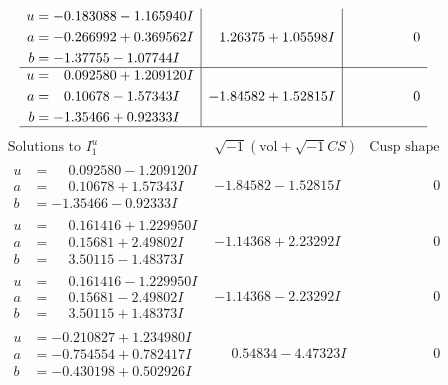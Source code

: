 \documentclass[1p]{elsarticle_modified}
\theoremstyle{definition}
\newcommand{\I}{\sqrt{-1}}
\begin{document}
$$\begin{array}{c|c|c}
\begin{aligned}
u &= -0.183088 - 1.165940 I \\
a &= -0.266992 + 0.369562 I \\
b &= -1.37755 - 1.07744 I\end{aligned}
 & \phantom{-}1.26375 + 1.05598 I & \phantom{-0.000000 } 0 \\ \hline\begin{aligned}
u &= \phantom{-}0.092580 + 1.209120 I \\
a &= \phantom{-}0.10678 - 1.57343 I \\
b &= -1.35466 + 0.92333 I\end{aligned}
 & -1.84582 + 1.52815 I & \phantom{-0.000000 } 0\\
 \hline 
 \end{array}$$\newpage$$\begin{array}{c|c|c}  
\text{Solutions to }I^u_{1}& \I (\text{vol} + \sqrt{-1}CS) & \text{Cusp shape}\\
 \hline 
\begin{aligned}
u &= \phantom{-}0.092580 - 1.209120 I \\
a &= \phantom{-}0.10678 + 1.57343 I \\
b &= -1.35466 - 0.92333 I\end{aligned}
 & -1.84582 - 1.52815 I & \phantom{-0.000000 } 0 \\ \hline\begin{aligned}
u &= \phantom{-}0.161416 + 1.229950 I \\
a &= \phantom{-}0.15681 + 2.49802 I \\
b &= \phantom{-}3.50115 - 1.48373 I\end{aligned}
 & -1.14368 + 2.23292 I & \phantom{-0.000000 } 0 \\ \hline\begin{aligned}
u &= \phantom{-}0.161416 - 1.229950 I \\
a &= \phantom{-}0.15681 - 2.49802 I \\
b &= \phantom{-}3.50115 + 1.48373 I\end{aligned}
 & -1.14368 - 2.23292 I & \phantom{-0.000000 } 0 \\ \hline\begin{aligned}
u &= -0.210827 + 1.234980 I \\
a &= -0.754554 + 0.782417 I \\
b &= -0.430198 + 0.502926 I\end{aligned}
 & \phantom{-}0.54834 - 4.47323 I & \phantom{-0.000000 } 0 \\ \hline\begin{aligned}

\end{aligned}
\end{array}$$
\end{document}
